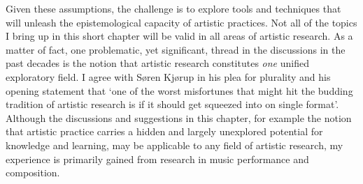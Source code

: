 \documentclass[12pt]{article}
\begin{document}

Given these assumptions, the challenge is to explore tools and techniques that will unleash the epistemological capacity of artistic practices. Not all of the topics I bring up in this short chapter will be valid in all areas of artistic research. As a matter of fact, one problematic, yet significant, thread in the discussions in the past decades is the notion that artistic research constitutes \emph{one} unified exploratory field. I agree with S{\o}ren Kj{\o}rup  in his plea for plurality and his opening statement that `one of the worst misfortunes that might hit the budding tradition of artistic research is if it should get squeezed into on single format'. Although the discussions and suggestions in this chapter, for example the notion that artistic practice carries a hidden and largely unexplored potential for knowledge and learning, may be applicable to any field of artistic research, my experience is primarily gained from research in music performance and composition. 
\end{document}
